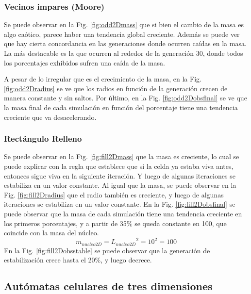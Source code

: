\subsubsection{Vecinos impares (Moore)}
Se puede observar en la Fig. \ref{fig:odd2Dmass} que si bien el cambio de la masa es algo caótico, parece haber una tendencia global creciente.
Además se puede ver que hay cierta concordancia en las generaciones donde ocurren caídas en la masa. La más destacable es la que ocurren al rededor de la generación 30, donde todos los porcentajes exhibidos sufren una caída de la masa.

A pesar de lo irregular que es el crecimiento de la masa, en la Fig. \ref{fig:odd2Dradius} se ve que los radios en función de la generación crecen de manera constante y sin saltos.
Por último, en la Fig. \ref{fig:odd2Dobsfinal} se ve que la masa final de cada simulación en función del porcentaje tiene una tendencia creciente que va desacelerando.

\subsubsection{Rectángulo Relleno}
Se puede observar en la Fig. \ref{fig:fill2Dmass} que la masa es creciente, lo cual se puede explicar con la regla que establece que si la celda ya estaba viva antes, entonces sigue viva en la siguiente iteración.
Y luego de algunas iteraciones se estabiliza en un valor constante.
Al igual que la masa, se puede observar en la Fig. \ref{fig:fill2Dradius} que el radio también es creciente, y luego de algunas iteraciones se estabiliza en un valor constante.
En la Fig. \ref{fig:fill2Dobsfinal} se puede observar que la masa de cada simulación tiene una tendencia creciente en los primeros porcentajes, y a partir de 35\% se queda constante en 100,
que coincide con la masa del núcleo.
\begin{equation}
    m_{nucleo2D} = {L_{nucleo2D}}^2 = 10^2 = 100
\end{equation}
En la Fig. \ref{fig:fill2Dobsstable} se puede observar que la generación de estabilización crece hasta el 20\%, y luego decrece.


\subsection{Autómatas celulares de tres dimensiones}
\label{subsec:results3d}

